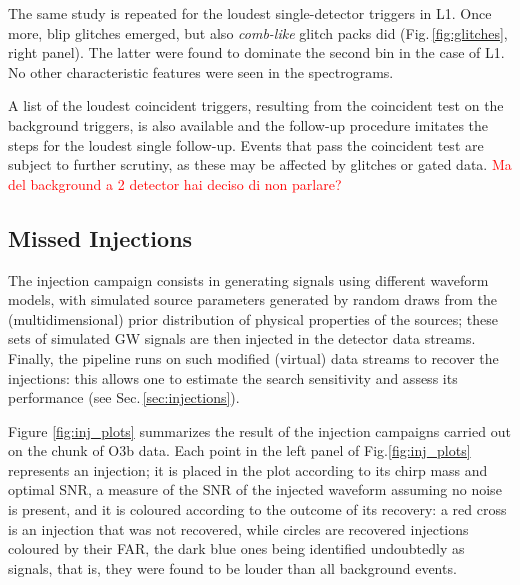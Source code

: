 \documentclass[binding=0.6cm, LaM]{sapthesis}
\newcommand{\fpg}[1]{\textcolor{red}{#1} }
\begin{document}
	The same study is repeated for the loudest single-detector triggers in L1.
	Once more, blip glitches emerged, but also {\it comb-like} glitch packs did (Fig.\,\ref{fig:glitches}, right panel).
        The latter were found to dominate the second bin in the case of L1.
	No other characteristic features were seen in the spectrograms.
	
	A list of the loudest coincident triggers, resulting from the coincident test on the background triggers, 	
	is also available and the follow-up procedure imitates the steps for the loudest single follow-up.
	Events that pass the coincident test are subject to further scrutiny, 
	as these may be affected by glitches or gated data.
        \fpg{Ma del background a 2 detector hai deciso di non parlare?}

\subsection{Missed Injections}
 	The injection campaign consists in generating signals using different waveform models,
        with simulated source parameters generated by random draws from the (multidimensional) prior distribution of physical properties of the sources;
        these sets of simulated GW signals are then injected in the detector data streams.
        Finally, the pipeline runs on such modified (virtual) data streams to recover the injections: 
	this allows one to estimate the search sensitivity and assess its performance (see Sec.\,\ref{sec:injections}).

        Figure \ref{fig:inj_plots} summarizes the result of the injection campaigns carried out on the chunk of O3b data.
        Each point in the left panel of Fig.\ref{fig:inj_plots} represents an injection;
        it is placed in the plot according to its chirp mass and optimal SNR,
        a measure of the SNR of the injected waveform assuming no noise is present,
        and it is coloured according to the outcome of its recovery:
        a red cross is an injection that was not recovered,
        while circles are recovered injections coloured by their FAR,
        the dark blue ones being identified undoubtedly as signals, that is,
        they were found to be louder than all background events.
\end{document}
